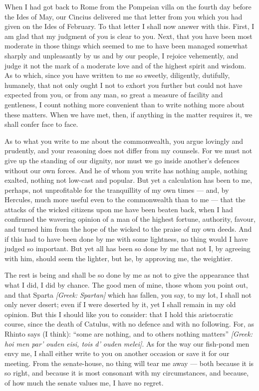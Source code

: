 

 When I had got back to Rome from the Pompeian villa on the fourth day before the Ides of May, our Cincius delivered me that letter from you which you had given on the Ides of February. To that letter I shall now answer with this. First, I am glad that my judgment of you is clear to you. Next, that you have been most moderate in those things which seemed to me to have been managed somewhat sharply and unpleasantly by us and by our people, I rejoice vehemently, and judge it not the mark of a moderate love and of the highest spirit and wisdom. As to which, since you have written to me so sweetly, diligently, dutifully, humanely, that not only ought I not to exhort you further but could not have expected from you, or from any man, so great a measure of facility and gentleness, I count nothing more convenient than to write nothing more about these matters. When we have met, then, if anything in the matter requires it, we shall confer face to face.

 As to what you write to me about the commonwealth, you argue lovingly and prudently, and your reasoning does not differ from my counsels. For we must not give up the standing of our dignity, nor must we go inside another's defences without our own forces. And he of whom you write has nothing ample, nothing exalted, nothing not low-cast and popular. But yet a calculation has been to me, perhaps, not unprofitable for the tranquillity of my own times --- and, by Hercules, much more useful even to the commonwealth than to me --- that the attacks of the wicked citizens upon me have been beaten back, when I had confirmed the wavering opinion of a man of the highest fortune, authority, favour, and turned him from the hope of the wicked to the praise of my own deeds. And if this had to have been done by me with some lightness, no thing would I have judged so important. But yet all has been so done by me that not I, by agreeing with him, should seem the lighter, but he, by approving me, the weightier.

 The rest is being and shall be so done by me as not to give the appearance that what I did, I did by chance. The good men of mine, those whom you point out, and that Sparta \textit{[Greek: Spartan]} which has fallen, you say, to my lot, I shall not only never desert; even if I were deserted by it, yet I shall remain in my old opinion. But this I should like you to consider: that I hold this aristocratic course, since the death of Catulus, with no defence and with no following. For, as Rhinto says (I think): ``some are nothing, and to others nothing matters'' \textit{[Greek: hoi men par' ouden eisi, tois d' ouden melei]}. As for the way our fish-pond men envy me, I shall either write to you on another occasion or save it for our meeting. From the senate-house, no thing will tear me away --- both because it is so right, and because it is most consonant with my circumstances, and because, of how much the senate values me, I have no regret.

